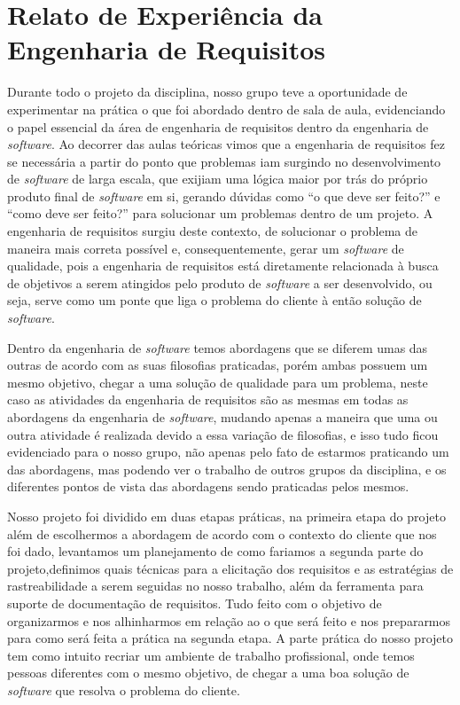 \chapter{Relato de Experiência da Engenharia de Requisitos}

Durante todo o projeto da disciplina, nosso grupo teve a oportunidade de experimentar na prática o que foi abordado dentro de sala de aula, evidenciando o papel essencial da área de engenharia de requisitos dentro da engenharia de \textit{software}. Ao decorrer das aulas teóricas vimos que a engenharia de requisitos fez se necessária a partir do ponto que problemas iam surgindo no desenvolvimento de \textit{software} de larga escala, que exijiam uma lógica maior por trás do próprio produto final de \textit{software} em si, gerando dúvidas como ``o que deve ser feito?'' e ``como deve ser feito?'' para solucionar um problemas dentro de um projeto. A engenharia de requisitos surgiu deste contexto, de solucionar o problema de maneira mais correta possível e, consequentemente, gerar um \textit{software} de qualidade, pois a engenharia de requisitos está diretamente relacionada à busca de objetivos a serem atingidos pelo produto de \textit{software} a ser desenvolvido, ou seja, serve como um ponte que liga o problema do cliente à então solução de \textit{software}.

Dentro da engenharia de \textit{software} temos abordagens que se diferem umas das outras de acordo com as suas filosofias praticadas, porém ambas possuem um mesmo objetivo, chegar a uma solução de qualidade para um problema, neste caso as atividades da engenharia de requisitos são as mesmas em todas as abordagens da engenharia de \textit{software}, mudando apenas a maneira que uma ou outra atividade é realizada devido a essa variação de filosofias, e isso tudo ficou evidenciado para o nosso grupo, não apenas pelo fato de estarmos praticando um das abordagens, mas podendo ver o trabalho de outros grupos da disciplina, e os diferentes pontos de vista das abordagens sendo praticadas pelos mesmos.

Nosso projeto foi dividido em duas etapas práticas, na primeira etapa do projeto além de escolhermos a abordagem de acordo com o contexto do cliente que nos foi dado, levantamos um planejamento de como fariamos a segunda parte do projeto,definimos quais técnicas para a elicitação dos requisitos e as estratégias de rastreabilidade a serem seguidas no nosso trabalho, além da ferramenta para suporte de documentação de requisitos. Tudo feito com o objetivo de organizarmos e nos alhinharmos em relação ao o que será feito e nos prepararmos para como será feita a prática na segunda etapa. A parte prática do nosso projeto tem como intuito recriar um ambiente de trabalho profissional, onde temos pessoas diferentes com o mesmo objetivo, de chegar a uma boa solução de \textit{software} que resolva o problema do cliente.


